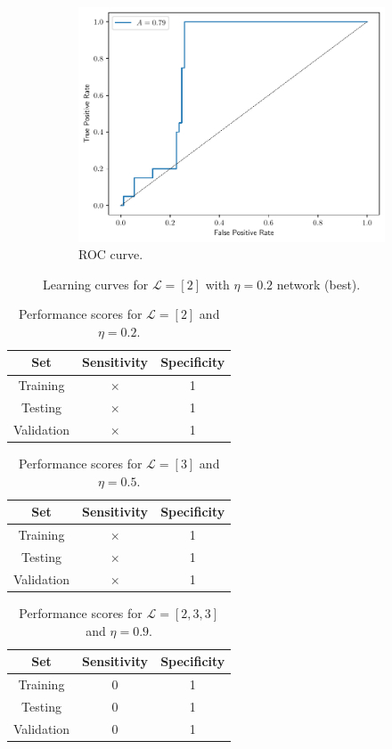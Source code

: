 \documentclass[conference]{IEEEtran}
\theoremstyle{definition}
\theoremstyle{remark}
\theoremstyle{remark}
\begin{document}
\begin{figure}
\begin{subfigure}[b]{0.32\textwidth}
        \includegraphics[width=\textwidth]{figs/2-0.2-emb-roc.pdf}
        \caption{ROC curve.}
    \end{subfigure}
    \caption{Learning curves for $\mathcal{L}=[2]$ with $\eta=0.2$ network
    (best).}
\end{figure}

\begin{table}
\centering
\caption{Performance scores for $\mathcal{L}=[2]$ and $\eta=0.2$.}
\label{tab:L2_emb}
\begin{tabular}{ccc}
\hline
\textbf{Set} & \textbf{Sensitivity} & \textbf{Specificity} \\ \hline
Training & $\times$ & 1 \\
Testing & $\times$ & 1 \\
Validation & $\times$ & 1 \\ \hline
\end{tabular}
\end{table}

\begin{table}
\centering
\caption{Performance scores for $\mathcal{L}=[3]$ and $\eta=0.5$.}
\label{tab:L3_emb}
\begin{tabular}{ccc}
\hline
\textbf{Set} & \textbf{Sensitivity} & \textbf{Specificity} \\ \hline
Training & $\times$ & 1 \\
Testing & $\times$ & 1 \\
Validation & $\times$ & 1 \\ \hline
\end{tabular}
\end{table}

\begin{table}
\centering
\caption{Performance scores for $\mathcal{L}=[2,3,3]$ and $\eta=0.9$.}
\label{tab:L233_emb}
\begin{tabular}{ccc}
\hline
\textbf{Set} & \textbf{Sensitivity} & \textbf{Specificity} \\ \hline
Training & 0 & 1 \\
Testing & 0 & 1 \\
Validation & 0 & 1 \\ \hline
\end{tabular}
\end{table}
\end{document}
